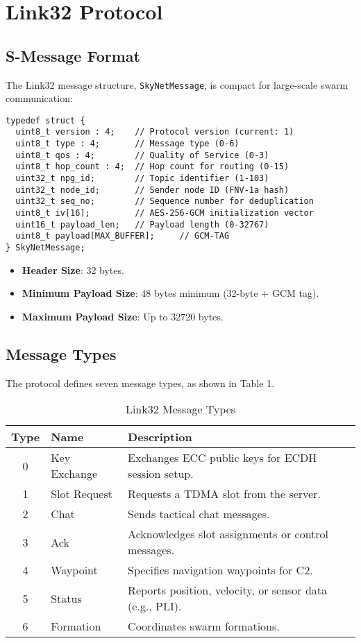 \documentclass{article}
\begin{document}
\section{Link32 Protocol}

\subsection{S-Message Format}
The Link32 message structure, \texttt{SkyNetMessage}, is compact for large-scale swarm
communication:
\begin{lstlisting}
typedef struct {
  uint8_t version : 4;    // Protocol version (current: 1)
  uint8_t type : 4;       // Message type (0-6)
  uint8_t qos : 4;        // Quality of Service (0-3)
  uint8_t hop_count : 4;  // Hop count for routing (0-15)
  uint32_t npg_id;        // Topic identifier (1-103)
  uint32_t node_id;       // Sender node ID (FNV-1a hash)
  uint32_t seq_no;        // Sequence number for deduplication
  uint8_t iv[16];         // AES-256-GCM initialization vector
  uint16_t payload_len;   // Payload length (0-32767)
  uint8_t payload[MAX_BUFFER];     // GCM-TAG
} SkyNetMessage;
\end{lstlisting}
\begin{itemize}
    \item \textbf{Header Size}: 32 bytes.
    \item \textbf{Minimum Payload Size}: 48 bytes minimum (32-byte + GCM tag).
    \item \textbf{Maximum Payload Size}: Up to 32720 bytes.
\end{itemize}

\newpage
\subsection{Message Types}
The protocol defines seven message types, as shown in Table 1.

\begin{table}[h]
\centering
\caption{Link32 Message Types}
\begin{tabular}{clp{6cm}}
\hline
\textbf{Type} & \textbf{Name} & \textbf{Description} \\
\hline
0 & Key Exchange & Exchanges ECC public keys for ECDH session setup. \\
1 & Slot Request & Requests a TDMA slot from the server. \\
2 & Chat         & Sends tactical chat messages. \\
3 & Ack          & Acknowledges slot assignments or control messages. \\
4 & Waypoint     & Specifies navigation waypoints for C2. \\
5 & Status       & Reports position, velocity, or sensor data (e.g., PLI). \\
6 & Formation    & Coordinates swarm formations. \\
\hline
\end{tabular}
\end{table}
\end{document}
